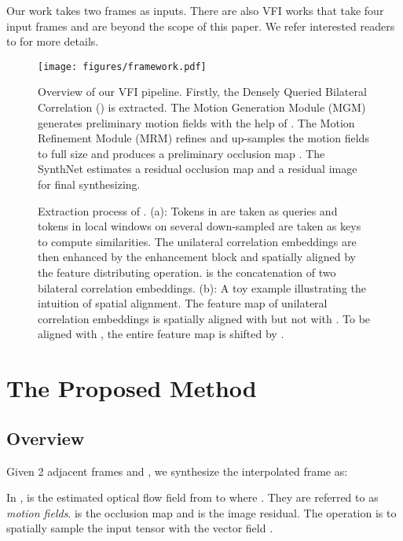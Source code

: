 \documentclass{article}
\begin{document}
Our work takes two frames as inputs. There are also VFI works that take four input frames and are beyond the scope of this paper. We refer interested readers to \cite{qvi,eqvi,inp4_1,inp4_2,inp4_3,inp4_4} for more details.

\begin{figure*}[t]
    \centering
    \texttt{[image: figures/framework.pdf]}
    \caption{Overview of our VFI pipeline. Firstly, the Densely Queried Bilateral Correlation () is extracted. The Motion Generation Module (MGM) generates preliminary motion fields with the help of . The Motion Refinement Module (MRM) refines and up-samples the motion fields to full size and produces a preliminary occlusion map . The SynthNet estimates a residual occlusion map  and a residual image  for final synthesizing.}
    \label{fig:framework}
\end{figure*}

\begin{figure*}[t]
    \centering
    \quad
   \caption{Extraction process of . (a): Tokens in  are taken as queries and tokens in local windows on several down-sampled  are taken as keys to compute similarities. The unilateral correlation embeddings are then enhanced by the enhancement block and spatially aligned by the feature distributing operation.  is the concatenation of two bilateral correlation embeddings. (b): A toy example illustrating the intuition of spatial alignment. The feature map of unilateral correlation embeddings is spatially aligned with  but not with . To be aligned with , the entire feature map is shifted by .
    }
    \label{fig:dqbc}
\end{figure*}


\section{The Proposed Method}

\subsection{Overview}

 Given 2 adjacent frames  and , we synthesize the interpolated frame  as:


In ,  is the estimated optical flow field from  to  where . They are referred to as \textit{motion fields}.  is the occlusion map and  is the image residual. The  operation is to spatially sample the input tensor  with the vector field .
\end{document}
